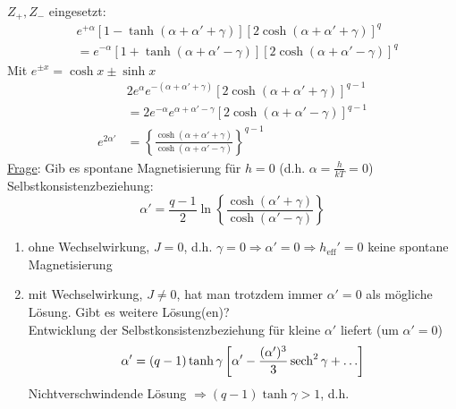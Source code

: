 \begin{enumerate}[A)]
\begin{equation}
    \end{equation}
    $Z_+, Z_-$ eingesetzt:
    \begin{equation}
        \begin{split}
            &e^{+\alpha} \left[ 1 - \tanh (\alpha + \alpha' + \gamma) \right] \left[ 2 \cosh (\alpha + \alpha' + \gamma) \right]^q \\
            &= e^{-\alpha} \left[ 1 + \tanh (\alpha + \alpha' - \gamma) \right] \left[ 2 \cosh (\alpha + \alpha' - \gamma) \right]^q
        \end{split}
    \end{equation}
    Mit $e^{\pm x} = \cosh x \pm \sinh x$
    \begin{equation}
        \begin{split}
            & 2 e^{\alpha} e^{-(\alpha + \alpha' + \gamma)} \left[ 2 \cosh (\alpha + \alpha' + \gamma) \right]^{q-1} \\
            &= 2 e^{-\alpha} e^{\alpha + \alpha' - \gamma} \left[ 2 \cosh (\alpha + \alpha' - \gamma) \right]^{q-1} \\
            e^{2 \alpha'} &= \left\{ \frac{\cosh(\alpha + \alpha' + \gamma)}{\cosh (\alpha + \alpha' - \gamma)} \right\}^{q-1}
        \end{split}
    \end{equation}
    \underline{Frage}: Gib es spontane Magnetisierung für $h=0$ (d.h. $\alpha = \frac{h}{k T} = 0$) \\
    Selbstkonsistenzbeziehung:
    \begin{equation}
        \alpha' = \frac{q-1}{2} \ln \left\{ \frac{\cosh (\alpha' + \gamma)}{\cosh (\alpha' - \gamma)} \right\}
    \end{equation}
    \begin{enumerate}
        \item ohne Wechselwirkung, $J = 0$, d.h. $\gamma = 0 \Rightarrow \alpha' = 0 \Rightarrow h_\text{eff}' = 0$ keine spontane Magnetisierung
        \item mit Wechselwirkung, $J \neq 0$, hat man trotzdem immer $\alpha' = 0$ als mögliche Lösung. Gibt es weitere Lösung(en)? \\
        Entwicklung der Selbstkonsistenzbeziehung für kleine $\alpha'$ liefert (um $\alpha' = 0$)
        \begin{equation}
            \alpha' = (q-1) \tanh \gamma \left[ \alpha' - \frac{(\alpha')^3}{3} \operatorname{sech}^2 \gamma + \ldots \right]
        \end{equation}
        Nichtverschwindende Lösung $\Rightarrow (q-1) \tanh \gamma > 1$, d.h.

\end{enumerate}
\end{enumerate}
